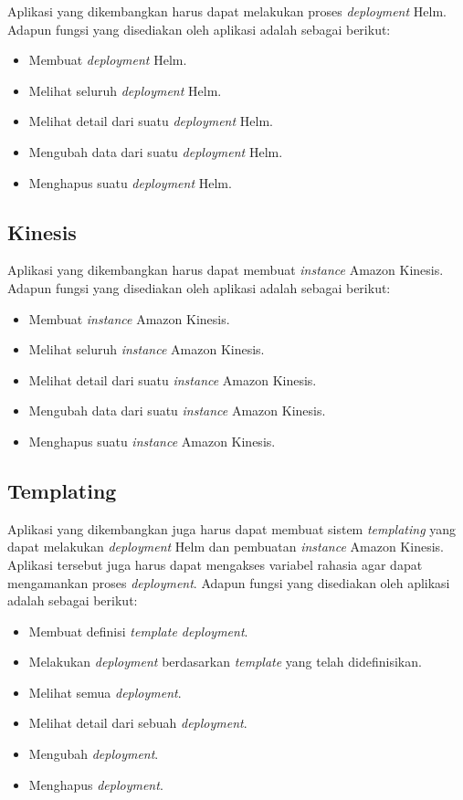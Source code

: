 Aplikasi yang dikembangkan harus dapat melakukan proses \textit{deployment} Helm. Adapun fungsi yang disediakan oleh aplikasi adalah sebagai berikut:

\begin{itemize}
    \item Membuat \textit{deployment} Helm.
    \item Melihat seluruh \textit{deployment} Helm.
    \item Melihat detail dari suatu \textit{deployment} Helm.
    \item Mengubah data dari suatu \textit{deployment} Helm.
    \item Menghapus suatu \textit{deployment} Helm.
\end{itemize}

\subsection{Kinesis}

Aplikasi yang dikembangkan harus dapat membuat \textit{instance} Amazon Kinesis. Adapun fungsi yang disediakan oleh aplikasi adalah sebagai berikut:

\begin{itemize}
    \item Membuat \textit{instance} Amazon Kinesis.
    \item Melihat seluruh \textit{instance} Amazon Kinesis.
    \item Melihat detail dari suatu \textit{instance} Amazon Kinesis.
    \item Mengubah data dari suatu \textit{instance} Amazon Kinesis.
    \item Menghapus suatu \textit{instance} Amazon Kinesis.
\end{itemize}

\subsection{Templating}

Aplikasi yang dikembangkan juga harus dapat membuat sistem \textit{templating} yang dapat melakukan \textit{deployment} Helm dan pembuatan \textit{instance} Amazon Kinesis. Aplikasi tersebut juga harus dapat mengakses variabel rahasia agar dapat mengamankan proses \textit{deployment}. Adapun fungsi yang disediakan oleh aplikasi adalah sebagai berikut:

\begin{itemize}
    \item Membuat definisi \textit{template deployment}.
    \item Melakukan \textit{deployment} berdasarkan \textit{template} yang telah didefinisikan.
    \item Melihat semua \textit{deployment}.
    \item Melihat detail dari sebuah \textit{deployment}.
    \item Mengubah \textit{deployment}.
    \item Menghapus \textit{deployment}.
\end{itemize}

